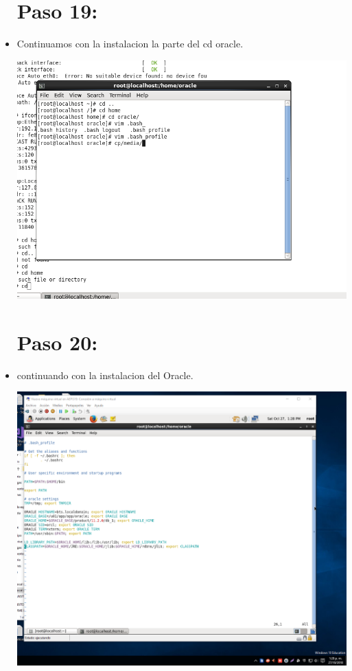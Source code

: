 \documentclass{article}
\begin{document}
\begin{itemize}
\section{Paso 19:} 
	\item Continuamos con la instalacion la parte del cd oracle.
	\begin{center}
	\includegraphics[width=13cm]{./Imagenes/imagen19} 
	\end{center}

\section{Paso 20:}
	\item continuando con la instalacion del Oracle.
	\begin{center}
	\includegraphics[width=13cm]{./Imagenes/imagen20} 
	\end{center}
	

\end{itemize}
\end{document}
